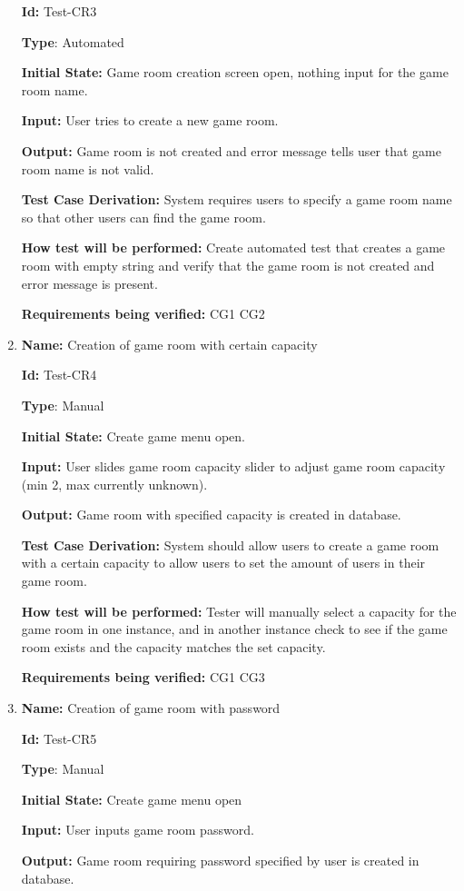 \documentclass[12pt, titlepage]{article}
\begin{document}
\begin{enumerate}
\textbf{Id:} Test-CR3

\textbf{Type}: Automated

\textbf{Initial State:} Game room creation screen open, nothing input for the game room name.

\textbf{Input:} User tries to create a new game room.

\textbf{Output:} Game room is not created and error message tells user that game room name is not valid.

\textbf{Test Case Derivation:} System requires users to specify a game room name so that other users can find the game room.

\textbf{How test will be performed:} Create automated test that creates a game room with empty string and verify that the game room is not created and error message is present.

\textbf{Requirements being verified:} CG1 CG2

\item{\textbf{Name:} Creation of game room with certain capacity}

\textbf{Id:} Test-CR4

\textbf{Type}: Manual

\textbf{Initial State:} Create game menu open.

\textbf{Input:} User slides game room capacity slider to adjust game room capacity (min 2, max currently unknown).

\textbf{Output:} Game room with specified capacity is created in database.

\textbf{Test Case Derivation:} System should allow users to create a game room with a certain capacity to allow users to set the amount of users in their game room.

\textbf{How test will be performed:} Tester will manually select a capacity for the game room in one instance, and in another instance check to see if the game room exists and the capacity matches the set capacity.

\textbf{Requirements being verified: }CG1 CG3

\item{\textbf{Name:} Creation of game room with password}

\textbf{Id:} Test-CR5

\textbf{Type}: Manual

\textbf{Initial State:} Create game menu open

\textbf{Input:} User inputs game room password.

\textbf{Output:} Game room requiring password specified by user is created in database.


\end{enumerate}
\end{document}
